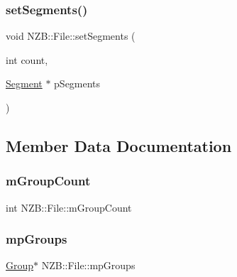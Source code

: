 \hypertarget{class_n_z_b_1_1_file_a35796f99c09199259761c16295635349}{}\label{class_n_z_b_1_1_file_a35796f99c09199259761c16295635349} 
\subsubsection{\texorpdfstring{set\+Segments()}{setSegments()}}
{\footnotesize\ttfamily void N\+Z\+B\+::\+File\+::set\+Segments (\begin{DoxyParamCaption}\item[{int}]{count,  }\item[{\hyperlink{class_n_z_b_1_1_segment}{Segment} $\ast$}]{p\+Segments }\end{DoxyParamCaption})}



\subsection{Member Data Documentation}
\hypertarget{class_n_z_b_1_1_file_aaf96258452951818ba93e90a5f0de6b6}{}\label{class_n_z_b_1_1_file_aaf96258452951818ba93e90a5f0de6b6} 
\subsubsection{\texorpdfstring{m\+Group\+Count}{mGroupCount}}
{\footnotesize\ttfamily int N\+Z\+B\+::\+File\+::m\+Group\+Count\hspace{0.3cm}{\ttfamily [protected]}}

\hypertarget{class_n_z_b_1_1_file_a1afca4ebb4dd759001b70e64ae4c8136}{}\label{class_n_z_b_1_1_file_a1afca4ebb4dd759001b70e64ae4c8136} 
\subsubsection{\texorpdfstring{mp\+Groups}{mpGroups}}
{\footnotesize\ttfamily \hyperlink{class_n_z_b_1_1_group}{Group}$\ast$ N\+Z\+B\+::\+File\+::mp\+Groups\hspace{0.3cm}{\ttfamily [protected]}}

\hypertarget{class_n_z_b_1_1_file_ad50b2da39f242433c24ae28be16a2429}{}\label{class_n_z_b_1_1_file_ad50b2da39f242433c24ae28be16a2429} 
